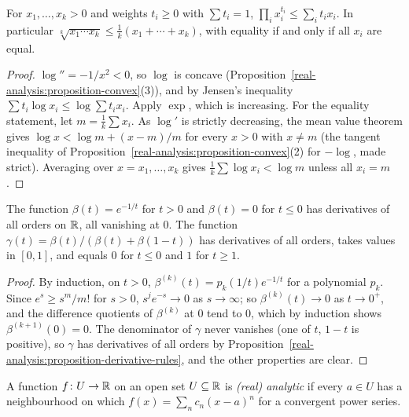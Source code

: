 \begin{corollary}\label{real-analysis:corollary-am-gm}
For $x_1, \ldots, x_k > 0$ and weights $t_i \geq 0$ with $\sum t_i = 1$, $\prod_ix_i^{t_i} \leq \sum_it_ix_i$. In particular $\sqrt[k]{x_1\cdots x_k} \leq \frac{1}{k}(x_1 + \cdots + x_k)$, with equality if and only if all $x_i$ are equal.
\end{corollary}

\begin{proof}
$\log'' = -1/x^2 < 0$, so $\log$ is concave (Proposition~\ref{real-analysis:proposition-convex}(3)), and by Jensen's inequality $\sum t_i\log x_i \leq \log\sum t_ix_i$. Apply $\exp$, which is increasing. For
the equality statement, let $m = \frac1k\sum x_i$. As $\log'$ is strictly decreasing, the mean value theorem gives $\log x < \log m + (x - m)/m$ for every $x > 0$ with $x \neq m$ (the tangent inequality of
Proposition~\ref{real-analysis:proposition-convex}(2) for $-\log$, made strict). Averaging over $x = x_1, \ldots, x_k$ gives $\frac1k\sum\log x_i < \log m$ unless all $x_i = m$.
\end{proof}

\begin{lemma}\label{real-analysis:lemma-bump}
The function $\beta(t) = e^{-1/t}$ for $t > 0$ and $\beta(t) = 0$ for $t \leq 0$ has derivatives of all orders on $\mathbb{R}$, all vanishing at $0$. The function
$\gamma(t) = \beta(t)/(\beta(t) + \beta(1 - t))$ has derivatives of all orders, takes values in $[0, 1]$, and equals $0$ for $t \leq 0$ and $1$ for $t \geq 1$.
\end{lemma}

\begin{proof}
By induction, on $t > 0$, $\beta^{(k)}(t) = p_k(1/t)e^{-1/t}$ for a polynomial $p_k$. Since $e^{s} \geq s^{m}/m!$ for $s > 0$, $s^je^{-s} \to 0$ as $s \to \infty$; so $\beta^{(k)}(t) \to 0$ as $t \to 0^+$, and
the difference quotients of $\beta^{(k)}$ at $0$ tend to $0$, which by induction shows $\beta^{(k+1)}(0) = 0$. The denominator of $\gamma$ never vanishes (one of $t$, $1 - t$ is positive), so $\gamma$ has derivatives of all orders by
Proposition~\ref{real-analysis:proposition-derivative-rules}, and the other properties are clear.
\end{proof}

\begin{definition}\label{real-analysis:definition-analytic}
A function $f \colon U \to \mathbb{R}$ on an open set $U \subseteq \mathbb{R}$ is \emph{(real) analytic} if every $a \in U$ has a neighbourhood on which $f(x) = \sum_nc_n(x - a)^n$ for a convergent power series.
\end{definition}


